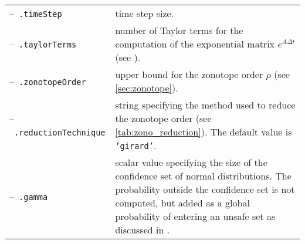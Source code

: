 \begin{center}
\renewcommand{\arraystretch}{1.3}
\begin{longtable}[t]{l p{11cm}}	
	--~\texttt{.timeStep} & time step size. \\
	--~\texttt{.taylorTerms} & number of Taylor terms for the computation of the exponential matrix $e^{A \Delta t}$ (see \cite[Sec.~4.2.4]{Althoff2010a}). \\
	--~\texttt{.zonotopeOrder} & upper bound for the zonotope order $\rho$ (see \cref{sec:zonotope}).\\
	--~\texttt{.reductionTechnique} & string specifying the method used to reduce the zonotope order (see \cref{tab:zono_reduction}). The default value is \texttt{'girard'}. \\
	--~\texttt{.gamma} & scalar value specifying the size of the confidence set of normal distributions. The probability outside the confidence set is not computed, but added as a global probability of entering an unsafe set as discussed in \cite[Sec.~4.2.3]{Althoff2010a}. 
\end{longtable}
\end{center}
